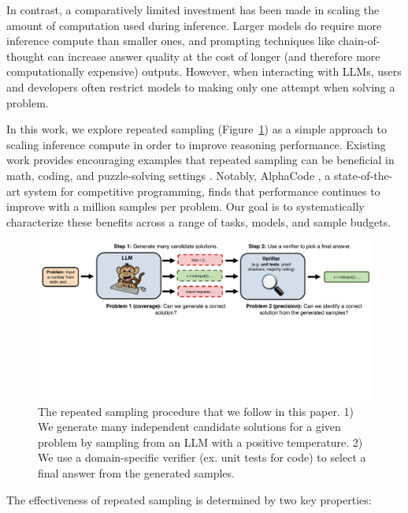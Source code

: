 \documentclass[11pt]{article}
\begin{document}
In contrast, a comparatively limited investment has been made in scaling the amount of computation used during inference. Larger models do require more inference compute than smaller ones, and prompting techniques like chain-of-thought \citep{wei2023chainofthought} can increase answer quality at the cost of longer (and therefore more computationally expensive) outputs. However, when interacting with LLMs, users and developers often restrict models to making only one attempt when solving a problem.

In this work, we explore repeated sampling (Figure~\ref{fig:banner}) as a simple approach to scaling inference compute in order to improve reasoning performance. Existing work provides encouraging examples that repeated sampling can be beneficial in math, coding, and puzzle-solving settings \citep{wang2023selfconsistency, rozière2023codellamaopenfoundation, arc_gpt4o}. Notably, AlphaCode \citep{Li_2022}, a state-of-the-art system for competitive programming, finds that performance continues to improve with a million samples per problem. Our goal is to systematically characterize these benefits across a range of tasks, models, and sample budgets.

\begin{figure}[t]
    \centering
    \includegraphics[width=\textwidth]{figures/banner.pdf}
    \caption{The repeated sampling procedure that we follow in this paper. 1) We generate many independent candidate solutions for a given problem by sampling from an LLM with a positive temperature. 2) We use a domain-specific verifier (ex. unit tests for code) to select a final answer from the generated samples.}  
    \label{fig:banner}
    \vspace{-0.5cm}
\end{figure}


The effectiveness of repeated sampling is determined by two key properties:
\end{document}

